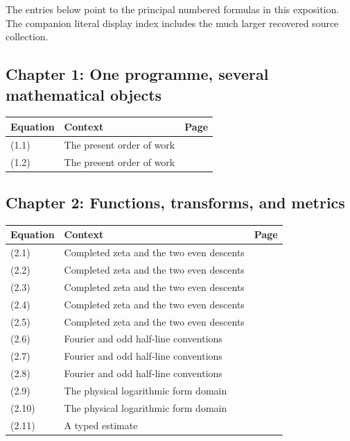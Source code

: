 \documentclass[
  10pt,
  a4paper,
  10pt,
  oneside,
  openany]{book}
\begin{document}
The entries below point to the principal numbered formulas in this
exposition. The companion literal display index includes the much larger
recovered source collection.

\subsection{Chapter 1: One programme, several mathematical
objects}\label{chapter-1-one-programme-several-mathematical-objects}

\begin{longtable}[]{@{}llr@{}}
\toprule\noalign{}
Equation & Context & Page \\
\midrule\noalign{}
\endhead
\bottomrule\noalign{}
\endlastfoot
(1.1) & The present order of work & \pageref{eq:1.1} \\
(1.2) & The present order of work & \pageref{eq:1.2} \\
\end{longtable}

\subsection{Chapter 2: Functions, transforms, and
metrics}\label{chapter-2-functions-transforms-and-metrics}

\begin{longtable}[]{@{}llr@{}}
\toprule\noalign{}
Equation & Context & Page \\
\midrule\noalign{}
\endhead
\bottomrule\noalign{}
\endlastfoot
(2.1) & Completed zeta and the two even descents & \pageref{eq:2.1} \\
(2.2) & Completed zeta and the two even descents & \pageref{eq:2.2} \\
(2.3) & Completed zeta and the two even descents & \pageref{eq:2.3} \\
(2.4) & Completed zeta and the two even descents & \pageref{eq:2.4} \\
(2.5) & Completed zeta and the two even descents & \pageref{eq:2.5} \\
(2.6) & Fourier and odd half-line conventions & \pageref{eq:2.6} \\
(2.7) & Fourier and odd half-line conventions & \pageref{eq:2.7} \\
(2.8) & Fourier and odd half-line conventions & \pageref{eq:2.8} \\
(2.9) & The physical logarithmic form domain & \pageref{eq:2.9} \\
(2.10) & The physical logarithmic form domain & \pageref{eq:2.10} \\
(2.11) & A typed estimate & \pageref{eq:2.11} \\
\end{longtable}
\end{document}
